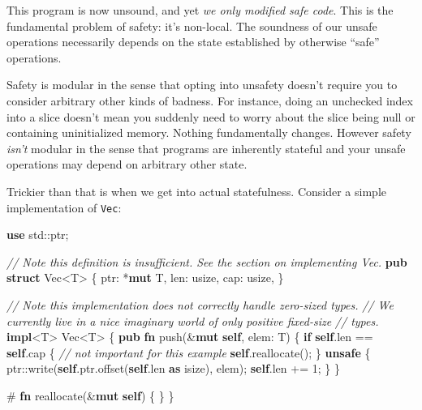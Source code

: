 \documentclass[a4paper,]{book}
\newenvironment{Shaded}{\begin{snugshade}}{\end{snugshade}}
\newcommand{\KeywordTok}[1]{\textcolor[rgb]{0.13,0.29,0.53}{\textbf{{#1}}}}
\newcommand{\DataTypeTok}[1]{\textcolor[rgb]{0.13,0.29,0.53}{{#1}}}
\newcommand{\DecValTok}[1]{\textcolor[rgb]{0.00,0.00,0.81}{{#1}}}
\newcommand{\CommentTok}[1]{\textcolor[rgb]{0.56,0.35,0.01}{\textit{{#1}}}}
\newcommand{\NormalTok}[1]{{#1}}
\begin{document}
This program is now unsound, and yet \emph{we only modified safe code}.
This is the fundamental problem of safety: it's non-local. The soundness
of our unsafe operations necessarily depends on the state established by
otherwise ``safe'' operations.

Safety is modular in the sense that opting into unsafety doesn't require
you to consider arbitrary other kinds of badness. For instance, doing an
unchecked index into a slice doesn't mean you suddenly need to worry
about the slice being null or containing uninitialized memory. Nothing
fundamentally changes. However safety \emph{isn't} modular in the sense
that programs are inherently stateful and your unsafe operations may
depend on arbitrary other state.

Trickier than that is when we get into actual statefulness. Consider a
simple implementation of \texttt{Vec}:

\begin{Shaded}
\begin{Highlighting}[]
\KeywordTok{use} \NormalTok{std::ptr;}

\CommentTok{// Note this definition is insufficient. See the section on implementing Vec.}
\KeywordTok{pub} \KeywordTok{struct} \DataTypeTok{Vec}\NormalTok{<T> \{}
    \NormalTok{ptr: *}\KeywordTok{mut} \NormalTok{T,}
    \NormalTok{len: }\DataTypeTok{usize}\NormalTok{,}
    \NormalTok{cap: }\DataTypeTok{usize}\NormalTok{,}
\NormalTok{\}}

\CommentTok{// Note this implementation does not correctly handle zero-sized types.}
\CommentTok{// We currently live in a nice imaginary world of only positive fixed-size}
\CommentTok{// types.}
\KeywordTok{impl}\NormalTok{<T> }\DataTypeTok{Vec}\NormalTok{<T> \{}
    \KeywordTok{pub} \KeywordTok{fn} \NormalTok{push(&}\KeywordTok{mut} \KeywordTok{self}\NormalTok{, elem: T) \{}
        \KeywordTok{if} \KeywordTok{self}\NormalTok{.len == }\KeywordTok{self}\NormalTok{.cap \{}
            \CommentTok{// not important for this example}
            \KeywordTok{self}\NormalTok{.reallocate();}
        \NormalTok{\}}
        \KeywordTok{unsafe} \NormalTok{\{}
            \NormalTok{ptr::write(}\KeywordTok{self}\NormalTok{.ptr.offset(}\KeywordTok{self}\NormalTok{.len }\KeywordTok{as} \DataTypeTok{isize}\NormalTok{), elem);}
            \KeywordTok{self}\NormalTok{.len += }\DecValTok{1}\NormalTok{;}
        \NormalTok{\}}
    \NormalTok{\}}

    \NormalTok{# }\KeywordTok{fn} \NormalTok{reallocate(&}\KeywordTok{mut} \KeywordTok{self}\NormalTok{) \{ \}}
\NormalTok{\}}
\end{Highlighting}
\end{Shaded}
\end{document}
